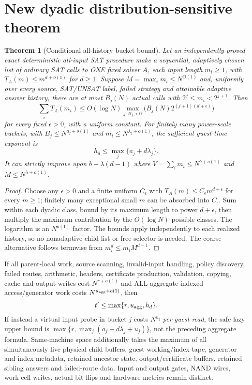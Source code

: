 \documentclass[11pt]{article}
\newtheorem{theorem}{Theorem}
\begin{document}
\section{New dyadic distribution-sensitive theorem}
\begin{theorem}[Conditional all-history bucket bound]\label{th:spectrum}
Let an independently proved exact deterministic all-input SAT procedure make a sequential, adaptively chosen list of ordinary SAT calls to ONE fixed solver $A$, each input length $m_i\ge1$, with $T_A(m)\le m^{d+o(1)}$ for $d\ge1$. Suppose $M=\max_i m_i\le N^{O(1)}$ and, uniformly over every source, SAT/UNSAT label, failed strategy and attainable adaptive answer history, there are at most $B_j(N)$ actual calls with $2^j\le m_i<2^{j+1}$. Then
\[
\sum_i T_A(m_i)
\le O(\log N)\max_{j:B_j>0}\bigl(B_j(N)2^{(j+1)(d+\epsilon)}\bigr)
\]
for every fixed $\epsilon>0$, with a uniform constant. For finitely many power-scale buckets, with $B_j\le N^{a_j+o(1)}$ and $m_i\le N^{\lambda_j+o(1)}$, the sufficient guest-time exponent is
\[
h_d\le\max_j\{a_j+d\lambda_j\}.
\]
It can strictly improve upon $b+\lambda(d-1)$ where $V=\sum_i m_i\le N^{b+o(1)}$ and $M\le N^{\lambda+o(1)}$.
\end{theorem}
\begin{proof}
Choose any $\epsilon>0$ and a finite uniform $C_\epsilon$ with $T_A(m)\le C_\epsilon m^{d+\epsilon}$ for every $m\ge1$; finitely many exceptional small $m$ can be absorbed into $C_\epsilon$. Sum within each dyadic class, bound by its maximum length to power $d+\epsilon$, then multiply the maximum contribution by the $O(\log N)$ possible classes. The logarithm is an $N^{o(1)}$ factor. The bounds apply independently to each realized history, so no nonadaptive child list or free selector is needed. The coarse alternative follows termwise from $m_i^d\le m_iM^{d-1}$. \end{proof}

If all parent-local work, source scanning, invalid-input handling, policy discovery, failed routes, arithmetic, headers, certificate production, validation, copying, cache and output writes cost $N^{r+o(1)}$ and ALL aggregate indexed-access/generator work costs $N^{u_{\rm agg}+o(1)}$, then
\[
t'\le\max\{r,u_{\rm agg},h_d\}.
\]
If instead a virtual input probe in bucket $j$ costs $N^{u_j}$ \emph{per guest read}, the safe lazy upper bound is $\max\{r,\max_j(a_j+d\lambda_j+u_j)\}$, not the preceding aggregate formula. Same-machine space additionally takes the maximum of all simultaneously live physical child buffers, guest working/index tape, generator and index metadata, retained ancestor state, output/certificate buffers, retained sibling answers and failed-route data. Input and output gates, NAND wires, work-cell writes, actual bit flips and hardware metrics remain distinct.
\end{document}
